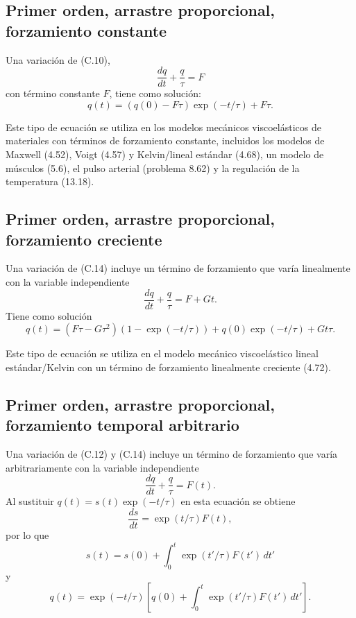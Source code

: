 \documentclass[12pt,a4paper]{book}
\begin{document}
\subsection*{Primer orden, arrastre proporcional, forzamiento constante}

Una variación de (C.10),
\begin{equation}
\frac{dq}{dt} + \frac{q}{\tau} = F
\label{eq:C.14}
\end{equation}
con término constante $F$, tiene como solución:
\begin{equation}
q(t) = (q(0) - F\tau) \exp(-t/\tau) + F\tau.
\label{eq:C.15}
\end{equation}

Este tipo de ecuación se utiliza en los modelos mecánicos viscoelásticos de materiales con términos de forzamiento constante, incluidos los modelos de Maxwell (4.52), Voigt (4.57) y Kelvin/lineal estándar (4.68), un modelo de músculos (5.6), el pulso arterial (problema 8.62) y la regulación de la temperatura (13.18).

\subsection*{Primer orden, arrastre proporcional, forzamiento creciente}

Una variación de (C.14) incluye un término de forzamiento que varía linealmente con la variable independiente
\begin{equation}
\frac{dq}{dt} + \frac{q}{\tau} = F + Gt.
\label{eq:C.16}
\end{equation}
Tiene como solución
\begin{equation}
q(t) = (F\tau - G\tau^2)(1 - \exp(-t/\tau)) + q(0) \exp(-t/\tau) + Gt\tau.
\label{eq:C.17}
\end{equation}

Este tipo de ecuación se utiliza en el modelo mecánico viscoelástico lineal estándar/Kelvin con un término de forzamiento linealmente creciente (4.72).

\subsection*{Primer orden, arrastre proporcional, forzamiento temporal arbitrario}

Una variación de (C.12) y (C.14) incluye un término de forzamiento que varía arbitrariamente con la variable independiente
\begin{equation}
\frac{dq}{dt} + \frac{q}{\tau} = F(t).
\label{eq:C.18}
\end{equation}
Al sustituir $q(t) = s(t) \exp(-t/\tau)$ en esta ecuación se obtiene
\begin{equation}
\frac{ds}{dt} = \exp(t/\tau) F(t),
\label{eq:C.19}
\end{equation}
por lo que
\begin{equation}
s(t) = s(0) + \int_{0}^{t} \exp(t'/\tau) F(t') \, dt'
\label{eq:C.20}
\end{equation}
y
\begin{equation}
q(t) = \exp(-t/\tau) \left[ q(0) + \int_{0}^{t} \exp(t'/\tau) F(t') \, dt' \right].
\label{eq:C.21}
\end{equation}
\end{document}
